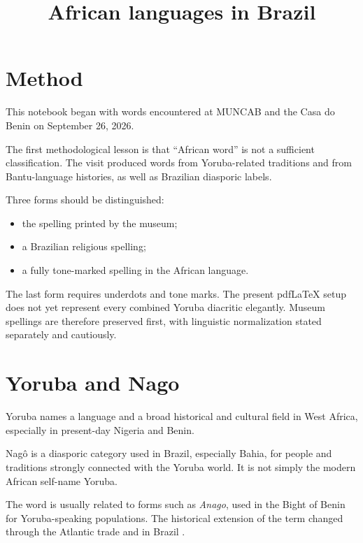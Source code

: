 



\title{African languages in Brazil}
\maketitle

\label{section-phantom}

\tableofcontents

\section{Method}
\label{section-african-languages-method}

This notebook began with words encountered
at MUNCAB and the Casa do Benin on
September 26, 2026.

The first methodological lesson is that
``African word'' is not a sufficient
classification.  The visit produced words
from Yoruba-related traditions and from
Bantu-language histories, as well as
Brazilian diasporic labels.

Three forms should be distinguished:

\begin{itemize}
\item the spelling printed by the museum;
\item a Brazilian religious spelling;
\item a fully tone-marked spelling in the
African language.
\end{itemize}

The last form requires underdots and tone
marks.  The present pdfLaTeX setup does not
yet represent every combined Yoruba
diacritic elegantly.  Museum spellings are
therefore preserved first, with linguistic
normalization stated separately and
cautiously.

\section{Yoruba and Nago}
\label{section-languages-yoruba-nago}

Yoruba names a language and a broad
historical and cultural field in West
Africa, especially in present-day Nigeria
and Benin.

Nag\^o is a diasporic category used in
Brazil, especially Bahia, for people and
traditions strongly connected with the
Yoruba world.  It is not simply the modern
African self-name Yoruba.

The word is usually related to forms such
as \emph{Anago}, used in the Bight of Benin
for Yoruba-speaking populations.  The
historical extension of the term changed
through the Atlantic trade and in Brazil
\cite{lovejoyojo2015lucumi}.

